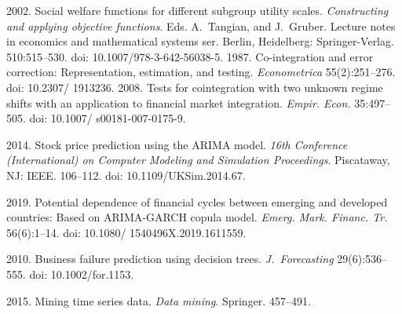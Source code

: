 







  \begin{multicols}{2}

\renewcommand{\bibname}{\protect\rmfamily References}

{\small\frenchspacing
 {%
 \begin{thebibliography}{99}
 2002. Social welfare 
functions for different subgroup utility scales. \textit{Constructing and applying objective functions}. 
Eds. A.~Tangian, and J.~Gruber. Lecture notes in economics and mathematical systems ser.
Berlin, Heidelberg: Springer-Verlag. 510:515--530. 
doi: 10.1007/978-3-642-56038-5.
 1987. Co-integration and error correction: Representation, estimation, and testing. 
 \textit{Econometrica} 55(2):251--276. doi: 10.2307/ 1913236.
 2008. Tests for cointegration with two unknown regime shifts with an 
application to financial market integration. \textit{Empir. Econ.} 35:497--505. 
doi: 10.1007/ s00181-007-0175-9.

 2014. 
Stock price prediction using the ARIMA model. \textit{16th  Conference
(International) on Computer Modeling and Simulation Proceedings}. Piscataway, NJ: IEEE. 106--112. 
doi: 10.1109/UKSim.2014.67.

 2019. Potential dependence
 of financial cycles between emerging and developed countries: Based on ARIMA-GARCH copula model.
 \textit{Emerg. Mark. Financ. Tr.} 56(6):1--14. 
 doi: 10.1080/ 1540496X.2019.1611559.


 2010. Business failure prediction using decision trees. 
\textit{J.~Forecasting} 29(6):536--555. doi: 10.1002/for.1153.

 2015. Mining time series data. \textit{Data mining}. Springer. 457--491.


\end{thebibliography}}}
\end{multicols}
